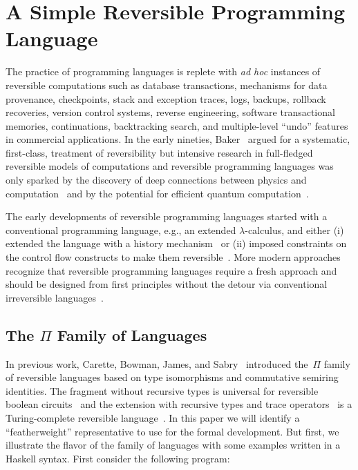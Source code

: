 \documentclass{entcs}
\begin{document}
\section{A Simple Reversible Programming Language}

The practice of programming languages is replete with \emph{ad hoc} instances of
reversible computations such as database transactions, mechanisms for data
provenance, checkpoints, stack and exception traces, logs, backups, rollback
recoveries, version control systems, reverse engineering, software transactional
memories, continuations, backtracking search, and multiple-level ``undo''
features in commercial applications. In the early nineties,
Baker~\cite{Baker:1992:LLL,Baker:1992:NFT} argued for a systematic, first-class,
treatment of reversibility but intensive research in full-fledged reversible
models of computations and reversible programming languages was only sparked by
the discovery of deep connections between physics and
computation~\cite{Landauer:1961,PhysRevA.32.3266,Toffoli:1980,bennett1985fundamental,Frank:1999:REC:930275}
and by the potential for efficient quantum
computation~\cite{springerlink:10.1007/BF02650179}.

The early developments of reversible programming languages started with a
conventional programming language, e.g., an extended $\lambda$-calculus, and either
(i) extended the language with a history
mechanism~\cite{vanTonder:2004,Kluge:1999:SEMCD,lorenz,danos2004reversible} or
(ii) imposed constraints on the control flow constructs to make them
reversible~\cite{Yokoyama:2007:RPL:1244381.1244404}. More modern approaches
recognize that reversible programming languages require a fresh approach and
should be designed from first principles without the detour via conventional
irreversible languages~\cite{Yokoyama:2008:PRP,Mu:2004:ILRC,abramsky2005structural,DiPierro:2006:RCL:1166042.1166047}.

\subsection{The $\Pi$ Family of Languages}

In previous work, Carette, Bowman, James, and
Sabry~\cite{rc2011,James:2012:IE:2103656.2103667,Carette2016} introduced
the~$\Pi$ family of reversible languages based on type isomorphisms and
commutative semiring identities. The fragment without recursive types is
universal for reversible boolean circuits~\cite{James:2012:IE:2103656.2103667}
and the extension with recursive types and trace
operators~\cite{Hasegawa:1997:RCS:645893.671607} is a Turing-complete reversible
language~\cite{James:2012:IE:2103656.2103667,rc2011}. In this paper we will
identify a ``featherweight'' representative to use for the formal
development. But first, we illustrate the flavor of the family of languages with
some examples written in a Haskell syntax. First consider the following program:
\end{document}
